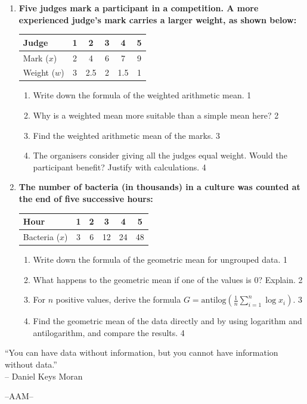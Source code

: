 \documentclass[12pt]{article}
\begin{document}
\begin{enumerate}
\item
\textbf{Five judges mark a participant in a competition. A more experienced judge's mark carries a larger weight, as shown below:}
\begin{center}
\begin{tabular}{l|c|c|c|c|c}
Judge & 1 & 2 & 3 & 4 & 5 \\ \hline
Mark ($x$) & 2 & 4 & 6 & 7 & 9 \\ \hline
Weight ($w$) & 3 & 2.5 & 2 & 1.5 & 1
\end{tabular}
\end{center}
\begin{enumerate}
  \item Write down the formula of the weighted arithmetic mean. \hfill 1
  \item Why is a weighted mean more suitable than a simple mean here? \hfill 2
  \item Find the weighted arithmetic mean of the marks. \hfill 3
  \item The organisers consider giving all the judges equal weight. Would the participant benefit? Justify with calculations. \hfill 4
\end{enumerate}

\item
\textbf{The number of bacteria (in thousands) in a culture was counted at the end of five successive hours:}
\begin{center}
\begin{tabular}{l|c|c|c|c|c}
Hour & 1 & 2 & 3 & 4 & 5 \\ \hline
Bacteria ($x$) & 3 & 6 & 12 & 24 & 48
\end{tabular}
\end{center}
\begin{enumerate}
  \item Write down the formula of the geometric mean for ungrouped data. \hfill 1
  \item What happens to the geometric mean if one of the values is 0? Explain. \hfill 2
  \item For $n$ positive values, derive the formula $\displaystyle G = \mbox{antilog}\left(\frac{1}{n}\sum_{i=1}^{n} \log x_i\right)$. \hfill 3
  \item Find the geometric mean of the data directly and by using logarithm and antilogarithm, and compare the results. \hfill 4
\end{enumerate}

\end{enumerate}

\vspace{1cm}

\begin{center}
``You can have data without information, but you cannot have information without data.''\\
-- Daniel Keys Moran
\end{center}

\vfill

\begin{center}
--AAM--
\end{center}
\end{document}
